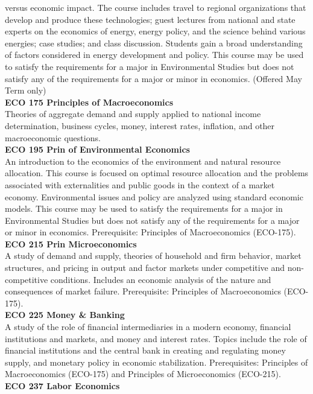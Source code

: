 \documentclass[
  letterpaper,
]{scrbook}
\begin{document}
versus economic impact. The course includes travel to regional
organizations that develop and produce these technologies; guest
lectures from national and state experts on the economics of energy,
energy policy, and the science behind various energies; case studies;
and class discussion. Students gain a broad understanding of factors
considered in energy development and policy. This course may be used to
satisfy the requirements for a major in Environmental Studies but does
not satisfy any of the requirements for a major or minor in economics.
(Offered May Term only)\\
\textbf{ECO 175 Principles of Macroeconomics}\\
Theories of aggregate demand and supply applied to national income
determination, business cycles, money, interest rates, inflation, and
other macroeconomic questions.\\
\textbf{ECO 195 Prin of Environmental Economics}\\
An introduction to the economics of the environment and natural resource
allocation. This course is focused on optimal resource allocation and
the problems associated with externalities and public goods in the
context of a market economy. Environmental issues and policy are
analyzed using standard economic models. This course may be used to
satisfy the requirements for a major in Environmental Studies but does
not satisfy any of the requirements for a major or minor in economics.
Prerequisite: Principles of Macroeconomics (ECO-175).\\
\textbf{ECO 215 Prin Microeconomics}\\
A study of demand and supply, theories of household and firm behavior,
market structures, and pricing in output and factor markets under
competitive and non-competitive conditions. Includes an economic
analysis of the nature and consequences of market failure. Prerequisite:
Principles of Macroeconomics (ECO-175).\\
\textbf{ECO 225 Money \& Banking}\\
A study of the role of financial intermediaries in a modern economy,
financial institutions and markets, and money and interest rates. Topics
include the role of financial institutions and the central bank in
creating and regulating money supply, and monetary policy in economic
stabilization. Prerequisites: Principles of Macroeconomics (ECO-175) and
Principles of Microeconomics (ECO-215).\\
\textbf{ECO 237 Labor Economics}\\
\end{document}
